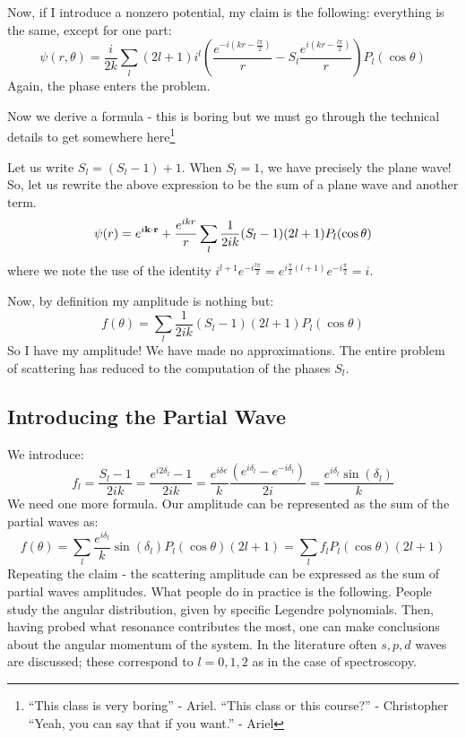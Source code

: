 Now, if I introduce a nonzero potential, my claim is the following: everything is the same, except for one part:
\begin{equation}
    \psi(r, \theta) = \frac{i}{2k}\sum_l (2l + 1)i^l\left(\frac{e^{-i(kr - \frac{l\pi}{2})}}{r} - S_l \frac{e^{i(kr - \frac{l\pi}{2})}}{r}\right)P_l(\cos\theta)
\end{equation}
Again, the phase enters the problem.

Now we derive a formula - this is boring but we must go through the technical details to get somewhere here\footnote{``This class is very boring'' - Ariel. ``This class or this course?'' - Christopher ``Yeah, you can say that if you want.'' - Ariel}

Let us write $S_l = (S_l - 1) + 1$. When $S_l = 1$, we have precisely the plane wave! So, let us rewrite the above expression to be the sum of a plane wave and another term.
\begin{equation}
    \psi(r) = e^{i\mathbf{k} \cdot \mathbf{r}} + \frac{e^{ikr}}{r}\sum_l \frac{1}{2ik}(S_l - 1)(2l + 1)P_l(\cos\theta)
\end{equation}
where we note the use of the identity $i^{l+1}e^{-i\frac{l\pi}{2}} = e^{i\frac{\pi}{2}(l+1)}e^{-i\frac{\pi}{2}} = i$. 

Now, by definition my amplitude is nothing but:
\begin{equation}
    f(\theta) = \sum_l \frac{1}{2ik}(S_l-1)(2l+1)P_l(\cos\theta)
\end{equation}
So I have my amplitude! We have made no approximations. The entire problem of scattering has reduced to the computation of the phases $S_l$. 

\subsection{Introducing the Partial Wave}
We introduce:
\begin{equation}
    f_l = \frac{S_l - 1}{2ik} = \frac{e^{i2\delta_l} - 1}{2ik} = \frac{e^{i\delta e}}{k}\frac{(e^{i\delta_l} - e^{-i\delta_l})}{2i} = \frac{e^{i\delta_l}\sin(\delta_l)}{k}
\end{equation}
We need one more formula. Our amplitude can be represented as the sum of the partial waves as:
\begin{equation}
    f(\theta) = \sum_l \frac{e^{i\delta_l}}{k}\sin(\delta_l)P_l(\cos\theta)(2l+1) = \sum_l f_l P_l(\cos\theta)(2l+1)
\end{equation}
Repeating the claim - the scattering amplitude can be expressed as the sum of partial waves amplitudes. What people do in practice is the following. People study the angular distribution, given by specific Legendre polynomials. Then, having probed what resonance contributes the most, one can make conclusions about the angular momentum of the system. In the literature often $s,p,d$ waves are discussed; these correspond to $l = 0,1,2$ as in the case of spectroscopy. 

